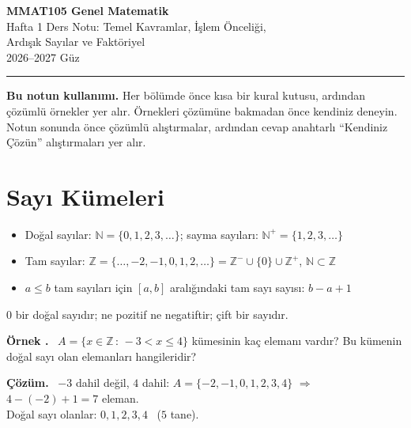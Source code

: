 \documentclass[11pt,a4paper]{article}
\newcounter{ornek}
\newenvironment{ornek}{\needspace{7\baselineskip}\refstepcounter{ornek}\par\medskip\noindent\textbf{\color{anamavi}Örnek \theornek.}\ }{\par}
\newenvironment{cozum}{\begin{tcolorbox}[colback=cozumyesil!6,colframe=cozumyesil,boxrule=0.5pt,left=4pt,right=4pt,top=2pt,bottom=2pt,breakable]\textbf{\color{cozumyesil}Çözüm.}\ }{\end{tcolorbox}}
\begin{document}
\begin{minipage}[c]{\textwidth}
{\LARGE\bfseries\color{anamavi} MMAT105 Genel Matematik}\\[4pt]
{\large Hafta 1 Ders Notu: Temel Kavramlar, İşlem Önceliği,\\ Ardışık Sayılar ve Faktöriyel}\\[6pt]
{\small 2026--2027 Güz}
\end{minipage}

\vspace{4pt}\noindent\textcolor{anamavi}{\rule{\textwidth}{1pt}}

\textbf{Bu notun kullanımı.} Her bölümde önce kısa bir kural kutusu, ardından çözümlü örnekler yer alır. Örnekleri çözümüne bakmadan önce kendiniz deneyin. Notun sonunda önce çözümlü alıştırmalar, ardından cevap anahtarlı ``Kendiniz Çözün'' alıştırmaları yer alır.

\section{Sayı Kümeleri}

\begin{kural}[Tanımlar]
\begin{itemize}[leftmargin=*,itemsep=1pt]
\item Doğal sayılar: \(\mathbb{N}=\{0,1,2,3,\dots\}\); \quad sayma sayıları: \(\mathbb{N}^{+}=\{1,2,3,\dots\}\)
\item Tam sayılar: \(\mathbb{Z}=\{\dots,-2,-1,0,1,2,\dots\}=\mathbb{Z}^{-}\cup\{0\}\cup\mathbb{Z}^{+}\), \quad \(\mathbb{N}\subset\mathbb{Z}\)
\item \(a\le b\) tam sayıları için \([a,b]\) aralığındaki tam sayı sayısı: \(b-a+1\)
\end{itemize}
\end{kural}

\begin{dikkat}
\(0\) bir doğal sayıdır; ne pozitif ne negatiftir; çift bir sayıdır.
\end{dikkat}

\begin{ornek}
\(A=\{x\in\mathbb{Z}\,:\,-3<x\le 4\}\) kümesinin kaç elemanı vardır? Bu kümenin doğal sayı olan elemanları hangileridir?
\end{ornek}
\begin{cozum}
\(-3\) dahil değil, \(4\) dahil: \(A=\{-2,-1,0,1,2,3,4\}\) \(\Rightarrow\) \(4-(-2)+1=7\) eleman.\\
Doğal sayı olanlar: \(0,1,2,3,4\) \ (\(5\) tane).
\end{cozum}
\end{document}
